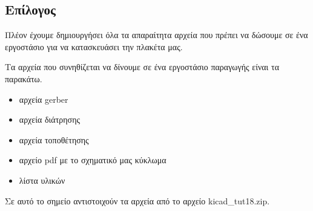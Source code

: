 \documentclass[a4paper]{article}
\begin{document}
\subsection{Επίλογος}
Πλέον έχουμε δημιουργήσει όλα τα απαραίτητα αρχεία που πρέπει να δώσουμε σε ένα εργοστάσιο για να κατασκευάσει την πλακέτα μας.

Τα αρχεία που συνηθίζεται να δίνουμε σε ένα εργοστάσιο παραγωγής είναι τα παρακάτω.

\begin{itemize}
    \item αρχεία gerber
    \item αρχεία διάτρησης
    \item αρχεία τοποθέτησης
    \item αρχείο pdf με το σχηματικό μας κύκλωμα
    \item λίστα υλικών
\end{itemize}

Σε αυτό το σημείο αντιστοιχούν τα αρχεία από το αρχείο kicad\_tut18.zip.

  
\end{document}
